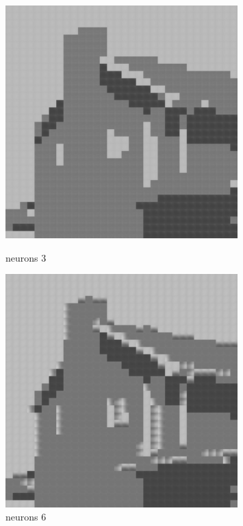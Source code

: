 \documentclass[../IDP_Task5_Karwowski_Kowalewski.tex]{subfiles}
\begin{document}
{{        \begin{figure}[!htbp]
            \begin{minipage}[c]{0.45\linewidth}
                \centering
                \includegraphics[width=0.8\textwidth]{img/kowalewski/crop_size_8_neurons_3.png}
                \caption{neurons 3}
            \end{minipage}\hfill
            \begin{minipage}[c]{0.45\linewidth}
                \centering
                \includegraphics[width=0.8\textwidth]{img/kowalewski/crop_size_8_neurons_6.png}
                \caption{neurons 6}
            \end{minipage}
        \end{figure}

}}
\end{document}
